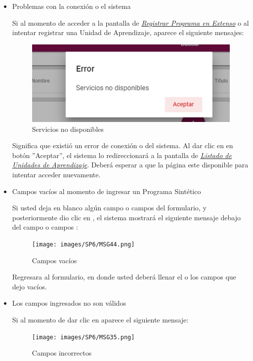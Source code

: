 \documentclass[10pt]{book}
\begin{document}
    \begin{itemize}
        \item Problemas con la conexión o el sistema

        Si al momento de acceder a la pantalla de \hyperlink{RegPE}{\textit{Registrar Programa en Extenso}} o al intentar registrar una Unidad de Aprendizaje, aparece el siguiente mensajes:

        \begin{figure}[!hbtp]
            \centering
            \includegraphics[width=0.4\linewidth]{images/SP6/MSGSN.png}
            \caption{Servicios no disponibles}
            \label{SND}

        \end{figure}
        
        Significa que existió un error de conexión o del sistema. Al dar clic en en botón ''Aceptar'', el sistema lo redireccionará a la pantalla de \hyperlink{verTareas}{\textit{Listado de Unidades de Aprendizaje}}. Deberá esperar a que la página este disponible para  intentar acceder nuevamente.

        \item Campos vacíos al momento de ingresar un Programa Sintético

        Si usted deja en blanco algún campo o campos del formulario, y posteriormente dio clic en , el sistema mostrará el siguiente mensaje debajo del campo o campos :
                
        \begin{figure}[!hbtp]
            \centering
            \texttt{[image: images/SP6/MSG44.png]}
            \caption{Campos vacíos}
            \label{mensaje44}
       \end{figure}

       Regresara al formulario, en donde usted deberá llenar el o los campos que dejo vacíos.

       \item Los campos ingresados no son válidos

       Si al momento de dar clic en  aparece el siguiente mensaje:
        \begin{figure}[!hbtp]
            \centering
            \texttt{[image: images/SP6/MSG35.png]}
            \caption{Campos incorrectos}
            \label{mensaje35}
        \end{figure}


\end{itemize}
\end{document}
